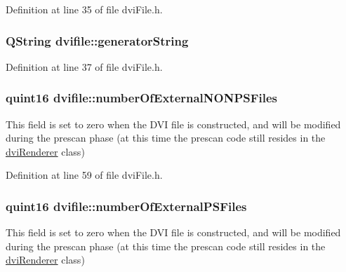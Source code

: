 Definition at line 35 of file dvi\+File.\+h.

\hypertarget{classdvifile_a65f21e8c100dbbf49f160f563d9fda30}{
\subsubsection[{generator\+String}]{\setlength{\rightskip}{0pt plus 5cm}Q\+String dvifile\+::generator\+String}}\label{classdvifile_a65f21e8c100dbbf49f160f563d9fda30}


Definition at line 37 of file dvi\+File.\+h.

\hypertarget{classdvifile_a341ffd0f617655a308d5d86fbb085400}{
\subsubsection[{number\+Of\+External\+N\+O\+N\+P\+S\+Files}]{\setlength{\rightskip}{0pt plus 5cm}quint16 dvifile\+::number\+Of\+External\+N\+O\+N\+P\+S\+Files}}\label{classdvifile_a341ffd0f617655a308d5d86fbb085400}
This field is set to zero when the D\+V\+I file is constructed, and will be modified during the prescan phase (at this time the prescan code still resides in the \hyperlink{classdviRenderer}{dvi\+Renderer} class) 

Definition at line 59 of file dvi\+File.\+h.

\hypertarget{classdvifile_abd8bd3fc29f66ce9220efbd0246d7fc0}{
\subsubsection[{number\+Of\+External\+P\+S\+Files}]{\setlength{\rightskip}{0pt plus 5cm}quint16 dvifile\+::number\+Of\+External\+P\+S\+Files}}\label{classdvifile_abd8bd3fc29f66ce9220efbd0246d7fc0}
This field is set to zero when the D\+V\+I file is constructed, and will be modified during the prescan phase (at this time the prescan code still resides in the \hyperlink{classdviRenderer}{dvi\+Renderer} class) 

